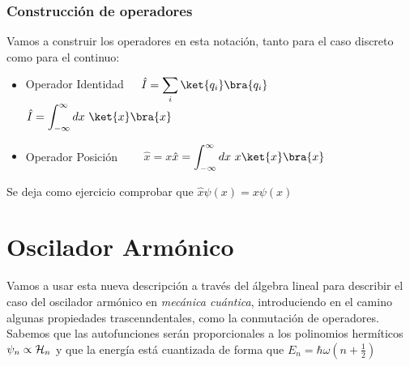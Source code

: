 \documentclass{report}
\begin{document}
      \subsubsection{Construcción de operadores}
        \noindent Vamos a construir los operadores en esta notación, tanto para el caso discreto como para el continuo:
        \begin{itemize}
          \item Operador Identidad\ \ \ $\hat{I}=\displaystyle\sum_i\ket{q_i}\bra{q_i}$\hspace{1cm}$\hat{I}=\displaystyle\int_{-\infty}^{\infty}dx\ \ket{x}\bra{x}$
          \item Operador Posición \ \ \ \ $\hat{x}=x$\hspace{2cm}$\hat{x}=\displaystyle\int_{-\infty}^\infty dx\ x\ket{x}\bra{x}$
        \end{itemize}
        Se deja como ejercicio comprobar que $\hat{x}\psi(x)=x\psi(x)$
  
  \clearpage
  \section{Oscilador Armónico}
    \noindent Vamos a usar esta nueva descripción a través del álgebra lineal para describir
    el caso del oscilador armónico en \textit{mecánica cuántica}, introduciendo en el camino 
    algunas propiedades trascenndentales, como la conmutación de operadores. Sabemos que 
    las autofunciones serán proporcionales a los polinomios hermíticos $\psi_n\propto \mathcal{H}_n$ y que la energía está
    cuantizada de forma que $E_n=\hbar\omega\left(n+\frac12\right)$\\
\end{document}
